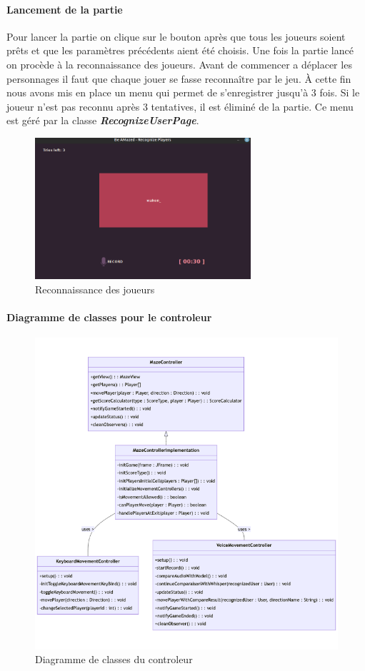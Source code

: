 \paragraph{Lancement de la partie}
Pour lancer la partie on clique sur le bouton
après que tous les joueurs soient prêts et que les paramètres précédents aient été choisis. Une fois la partie lancé on procède à la reconnaissance
des joueurs. Avant de commencer a déplacer les personnages il faut que chaque jouer se fasse reconnaître par le jeu. À cette fin nous avons mis en place un
menu qui permet de s'enregistrer jusqu'à 3 fois. Si le joueur n'est pas reconnu après 3 tentatives, il est éliminé de la partie. Ce menu est géré par la
classe \textbf{\textit{RecognizeUserPage}}.
\begin{figure}[H]
    \centering
    \includegraphics[width=8cm]{ressources/Implementation/Labyrinthe/Vue/Recognize.png}%
    \caption{Reconnaissance des joueurs}
    \label{fig:Recognition}
\end{figure}


\paragraph{Diagramme de classes pour le controleur}
\begin{figure}[h!]
    \centering
    \includegraphics[width=12cm]{ressources/Implementation/Labyrinthe/Controleur/MazeController.png}%
    \caption{Diagramme de classes du controleur}
    \label{fig:Controleur}
\end{figure}

